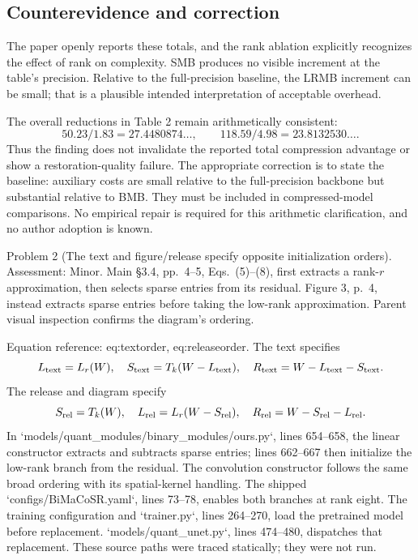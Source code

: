 \documentclass[10pt]{article}
\begin{document}
\subsection*{Counterevidence and correction}
The paper openly reports these totals, and the rank ablation explicitly recognizes the effect of rank on complexity. SMB produces no visible increment at the table’s precision. Relative to the full-precision baseline, the LRMB increment can be small; that is a plausible intended interpretation of acceptable overhead.\par
The overall reductions in Table 2 remain arithmetically consistent: \[50.23/1.83=27.4480874\ldots,\qquad
118.59/4.98=23.8132530\ldots.\] Thus the finding does not invalidate the reported total compression advantage or show a restoration-quality failure. The appropriate correction is to state the baseline: auxiliary costs are small relative to the full-precision backbone but substantial relative to BMB. They must be included in compressed-model comparisons. No empirical repair is required for this arithmetic clarification, and no author adoption is known.\par
Problem 2 (The text and figure/release specify opposite initialization orders).  Assessment: Minor. Main §3.4, pp. 4–5, Eqs. (5)–(8), first extracts a rank-\(r\) approximation, then selects sparse entries from its residual. Figure 3, p. 4, instead extracts sparse entries before taking the low-rank approximation. Parent visual inspection confirms the diagram’s ordering.\par
Equation reference: eq:textorder, eq:releaseorder. The text specifies \[
L_{\rm text}=L_r(W),\quad
S_{\rm text}=T_k(W-L_{\rm text}),\quad
R_{\rm text}=W-L_{\rm text}-S_{\rm text}.\] The release and diagram specify \[
S_{\rm rel}=T_k(W),\quad
L_{\rm rel}=L_r(W-S_{\rm rel}),\quad
R_{\rm rel}=W-S_{\rm rel}-L_{\rm rel}.\] In `models/quant\_modules/binary\_modules/ours.py`, lines 654–658, the linear constructor extracts and subtracts sparse entries; lines 662–667 then initialize the low-rank branch from the residual. The convolution constructor follows the same broad ordering with its spatial-kernel handling. The shipped `configs/BiMaCoSR.yaml`, lines 73–78, enables both branches at rank eight. The training configuration and `trainer.py`, lines 264–270, load the pretrained model before replacement. `models/quant\_unet.py`, lines 474–480, dispatches that replacement. These source paths were traced statically; they were not run.\par
\end{document}
